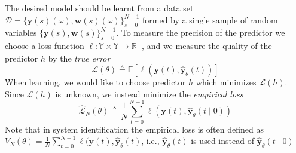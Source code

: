 \documentclass{ifacconf}
\def\eqref#1{(\ref{#1})}
\newcommand{\train}{\mathcal{D}}
\def\rvs{{\mathbf{s}}}
\def\rvw{{\mathbf{w}}}
\def\rvy{{\mathbf{y}}}
\def\sR{{\mathbb{R}}}
\def\sY{{\mathbb{Y}}}
\newcommand{\E}{\mathbb{E}}
\newtheorem{Definition}{Definition}[section]
\newcommand{\class}{\(\mathcal{SI}\)}
\begin{document}



The desired model should be learnt from a data set $\train=\{\rvy(s)(\omega),\rvw(s)(\omega)\}_{s=0}^{N-1}$ formed by a single sample of random variables $\{\rvy(s),\rvw(s)\}_{s=0}^{N-1}$. To measure the precision of the predictor we choose a loss function $\ell: \sY \times \sY \to \sR_+$, and 
we measure the quality of the predictor $h$ by  the \emph{true error}
\begin{equation}
    \label{gen:losses}
    \mathcal{L}(\theta) \triangleq \E[\ell(\rvy(t),\hat{\rvy}_{\theta}(t))]
\end{equation}
When learning, we would like to choose predictor $h$ which minimizes $\mathcal{L}(h)$. Since
$\mathcal{L}(h)$ is unknown, we instead minimize the 
\emph{empirical loss} %
\begin{equation}
    \label{prelim:losses}
    \hat{\mathcal{L}}_N(\theta)\triangleq\frac{1}{N}\sum_{t=0}^{N-1}\ell(\rvy(t),\hat{\rvy}_{\theta}(t \mid 0))
\end{equation} 
Note that in system identification the empirical loss is  often defined
as $V_N(\theta)=\frac{1}{N}\sum_{t=0}^{N-1}\ell(\rvy(t),\hat{\rvy}_{\theta}(t)$, i.e., $\hat{\rvy}_{\theta}(t)$  is used instead of $\hat{\rvy}_{\theta}(t \mid 0)$
\end{document}

